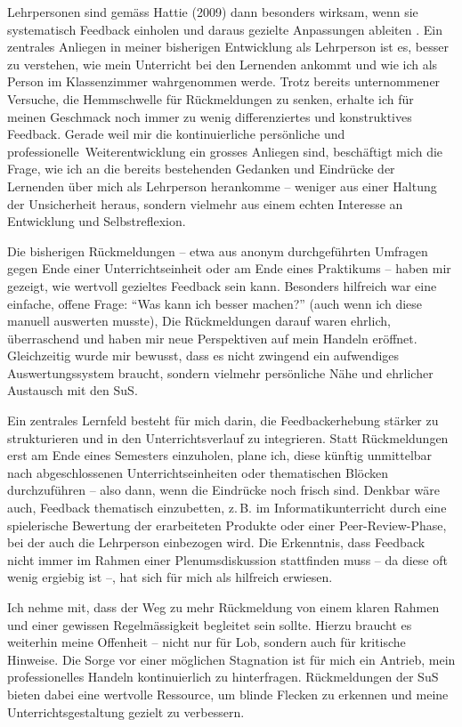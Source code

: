 Lehrpersonen sind gemäss Hattie (2009) dann besonders wirksam, wenn sie systematisch Feedback einholen und daraus gezielte Anpassungen ableiten \cite{alma991171885796805501}. Ein zentrales Anliegen in meiner bisherigen Entwicklung als Lehrperson ist es, besser zu verstehen, wie mein Unterricht bei den Lernenden ankommt und wie ich als Person im Klassenzimmer wahrgenommen werde. Trotz bereits unternommener Versuche, die Hemmschwelle für Rückmeldungen zu senken, erhalte ich für meinen Geschmack noch immer zu wenig differenziertes und konstruktives Feedback. Gerade weil mir die kontinuierliche persönliche und professionelle Weiterentwicklung ein grosses Anliegen sind, beschäftigt mich die Frage, wie ich an die bereits bestehenden Gedanken und Eindrücke der Lernenden über mich als Lehrperson herankomme – weniger aus einer Haltung der Unsicherheit heraus, sondern vielmehr aus einem echten Interesse an Entwicklung und Selbstreflexion.

Die bisherigen Rückmeldungen – etwa aus anonym durchgeführten Umfragen gegen Ende einer Unterrichtseinheit oder am Ende eines Praktikums – haben mir gezeigt, wie wertvoll gezieltes Feedback sein kann. Besonders hilfreich war eine einfache, offene Frage: \enquote{Was kann ich besser machen?} (auch wenn ich diese manuell auswerten musste), Die Rückmeldungen darauf waren ehrlich, überraschend und haben mir neue Perspektiven auf mein Handeln eröffnet. Gleichzeitig wurde mir bewusst, dass es nicht zwingend ein aufwendiges Auswertungssystem braucht, sondern vielmehr persönliche Nähe und ehrlicher Austausch mit den SuS.

Ein zentrales Lernfeld besteht für mich darin, die Feedbackerhebung stärker zu strukturieren und in den Unterrichtsverlauf zu integrieren. Statt Rückmeldungen erst am Ende eines Semesters einzuholen, plane ich, diese künftig unmittelbar nach abgeschlossenen Unterrichtseinheiten oder thematischen Blöcken durchzuführen – also dann, wenn die Eindrücke noch frisch sind. Denkbar wäre auch, Feedback thematisch einzubetten, z.\,B. im Informatikunterricht durch eine spielerische Bewertung der erarbeiteten Produkte oder einer Peer-Review-Phase, bei der auch die Lehrperson einbezogen wird. Die Erkenntnis, dass Feedback nicht immer im Rahmen einer Plenumsdiskussion stattfinden muss – da diese oft wenig ergiebig ist –, hat sich für mich als hilfreich erwiesen.

Ich nehme mit, dass der Weg zu mehr Rückmeldung von einem klaren Rahmen und einer gewissen Regelmässigkeit begleitet sein sollte. Hierzu braucht es weiterhin meine Offenheit -- nicht nur für Lob, sondern auch für kritische Hinweise. Die Sorge vor einer möglichen Stagnation ist für mich ein Antrieb, mein professionelles Handeln kontinuierlich zu hinterfragen. Rückmeldungen der SuS bieten dabei eine wertvolle Ressource, um blinde Flecken zu erkennen und meine Unterrichtsgestaltung gezielt zu verbessern.

